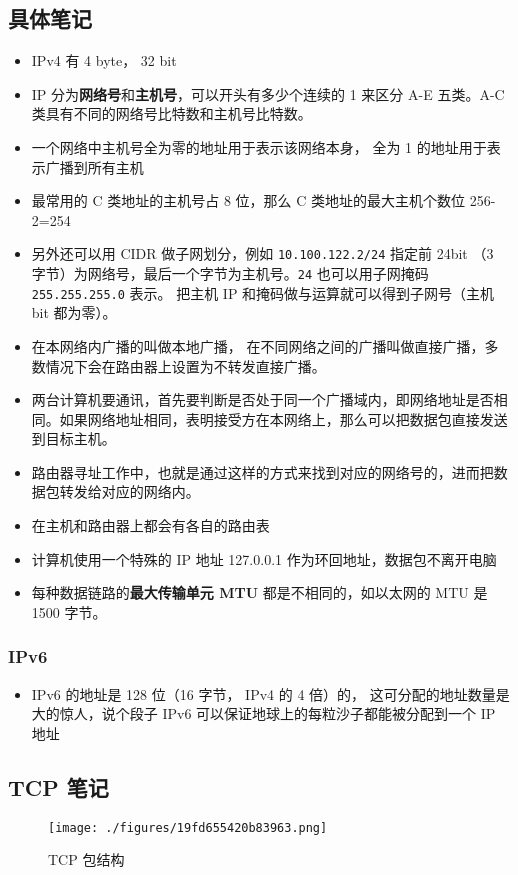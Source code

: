 \subsection{具体笔记}
\begin{itemize}
\item IPv4 有 4 byte， 32 bit
\item IP 分为\textbf{网络号}和\textbf{主机号}，可以开头有多少个连续的 1 来区分 A-E 五类。A-C 类具有不同的网络号比特数和主机号比特数。
\item 一个网络中主机号全为零的地址用于表示该网络本身， 全为 1 的地址用于表示广播到所有主机
\item 最常用的 C 类地址的主机号占 8 位，那么 C 类地址的最大主机个数位 256-2=254
\item 另外还可以用 CIDR 做子网划分，例如 \verb`10.100.122.2/24` 指定前 24bit （3 字节）为网络号，最后一个字节为主机号。\verb`24` 也可以用子网掩码 \verb`255.255.255.0` 表示。 把主机 IP 和掩码做与运算就可以得到子网号（主机 bit 都为零）。
\item 在本网络内广播的叫做本地广播， 在不同网络之间的广播叫做直接广播，多数情况下会在路由器上设置为不转发直接广播。
\item 两台计算机要通讯，首先要判断是否处于同一个广播域内，即网络地址是否相同。如果网络地址相同，表明接受方在本网络上，那么可以把数据包直接发送到目标主机。
\item 路由器寻址工作中，也就是通过这样的方式来找到对应的网络号的，进而把数据包转发给对应的网络内。
\item 在主机和路由器上都会有各自的路由表
\item 计算机使用一个特殊的 IP 地址  127.0.0.1 作为环回地址，数据包不离开电脑
\item 每种数据链路的\textbf{最大传输单元 MTU} 都是不相同的，如以太网的 MTU 是 1500 字节。
\end{itemize}

\subsubsection{IPv6}
\begin{itemize}
\item IPv6 的地址是 128 位（16 字节， IPv4 的 4 倍）的， 这可分配的地址数量是大的惊人，说个段子 IPv6 可以保证地球上的每粒沙子都能被分配到一个 IP 地址
\end{itemize}

\subsection{TCP 笔记}
\begin{figure}[ht]
\centering
\texttt{[image: ./figures/19fd655420b83963.png]}
\caption{TCP 包结构} \label{fig_NetNt_2}
\end{figure}

